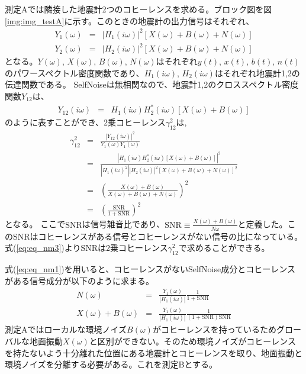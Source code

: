 測定Aでは隣接した地震計2つのコヒーレンスを求める。ブロック図を図\ref{img:img_testA}に示す。このときの地震計の出力信号はそれぞれ、
\begin{eqnarray}
  Y_{1}(\omega) &=& \left| H_{1}(i\omega)\right|^{2}\left[X(\omega)+B(\omega)+N(\omega) \right] \label{eq:eq_nm1} \\ 
  Y_{2}(\omega) &=& \left| H_{2}(i\omega)\right|^{2}\left[X(\omega)+B(\omega)+N(\omega) \right] \label{eq:eq_nm2}
\end{eqnarray}
となる。$Y(\omega),\,X(\omega),\,B(\omega),\,N(\omega)$はそれぞれ$y(t),\,x(t),\,b(t),\,n(t)$のパワースペクトル密度関数であり、$H_1(i\omega),\,H_2(i\omega)$はそれぞれ地震計1,2の伝達関数である。
SelfNoiseは無相関なので、地震計1,2のクロススペクトル密度関数$Y_{12}$は、
\begin{eqnarray}
Y_{12}(i\omega) &=& H_{1}(i\omega)H_{2}^{*}(i\omega)\left[X(\omega)+B(\omega) \right] 
\end{eqnarray}
のように表すことができ、2乗コヒーレンス$\gamma_{12}^{2}$は,
\begin{eqnarray}
  \gamma_{12}^{2} &=& \frac{\left| Y_{12}(i\omega)\right|^{2}}{Y_1(\omega)Y_1({\omega})}\\
  &=& \frac{\left | H_{1}(i\omega)H_{2}^{*}(i\omega)\left[X(\omega)+B(\omega) \right] \right |^{2}}{\left| H_{1}(i\omega)^{2}\right|\left|H_{2}(i\omega)\right|^{2}\left[X(\omega)+B(\omega)+N(\omega) \right]^{2}}\\
  &=& \left( \frac{X(\omega)+B(\omega)}{X(\omega)+B(\omega)+N(\omega)} \right)^{2}\\
    &=& \left( \frac{\mathrm{SNR}}{1+\mathrm{SNR}} \right)^{2}\label{eq:eq_nm3}
\end{eqnarray}
となる。
ここで$\mathrm{SNR}$は信号雑音比であり、$\mathrm{SNR}\equiv \frac{X(\omega)+B(\omega)}{N{\omega}}$と定義した。このSNRはコヒーレンスがある信号とコヒーレンスがない信号の比になっている。式(\ref{eq:eq_nm3})より$\mathrm{SNR}$は2乗コヒーレンス$\gamma^{2}_{12}$で求めることができる。

式(\ref{eq:eq_nm1})を用いると、コヒーレンスがないSelfNoise成分とコヒーレンスがある信号成分が以下のように求まる。
\begin{eqnarray}
  N(\omega) &=& \frac{Y_{1}(\omega)}{\left| H_{1}(i\omega) \right|}\frac{1}{1+\mathrm{SNR}} \label{eq:eq_nm4}\\
  X(\omega) + B(\omega) &=& \frac{Y_{1}(\omega)}{\left| H_{1}(i\omega) \right|}\frac{1}{(1+\mathrm{SNR})\mathrm{SNR}} \label{eq:eq_num5}
\end{eqnarray}
測定Aではローカルな環境ノイズ$B(\omega)$がコヒーレンスを持っているためグローバルな地面振動$X({\omega})$と区別ができない。そのため環境ノイズがコヒーレンスを持たないよう十分離れた位置にある地震計とコヒーレンスを取り、地面振動と環境ノイズを分離する必要がある。これを測定Bとする。


